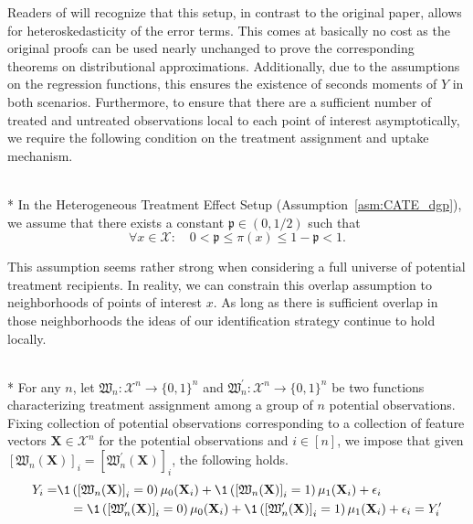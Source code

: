 Readers of \citet{demirkaya_optimal_2024} will recognize that this setup, in contrast to the original paper, allows for heteroskedasticity of the error terms.
This comes at basically no cost as the original proofs can be used nearly unchanged to prove the corresponding theorems on distributional approximations.
Additionally, due to the assumptions on the regression functions, this ensures the existence of seconds moments of $Y$ in both scenarios.
Furthermore, to ensure that there are a sufficient number of treated and untreated observations local to each point of interest asymptotically, we require the following condition on the treatment assignment and uptake mechanism.
\begin{boxD}
	\begin{asm}\label{asm:treatment_overlap}\mbox{}\\*
		In the Heterogeneous Treatment Effect Setup (Assumption~\ref{asm:CATE_dgp}), we assume that there exists a constant $\mathfrak{p} \in (0, 1/2)$ such that
		\begin{equation}
			\forall x \in \mathcal{X}: \quad 
			0 < \mathfrak{p} \leq \pi\left(x\right) \leq 1 - \mathfrak{p} < 1.
		\end{equation}
	\end{asm}
\end{boxD}
This assumption seems rather strong when considering a full universe of potential treatment recipients.
In reality, we can constrain this overlap assumption to neighborhoods of points of interest $x$.
As long as there is sufficient overlap in those neighborhoods the ideas of our identification strategy continue to hold locally.
\begin{boxD}
	\begin{asm}\label{asm:sutva}\mbox{}\\*
		For any $n$, let $\mathfrak{W}_{n}: \mathcal{X}^{n} \rightarrow \{0,1\}^{n}$ and $\mathfrak{W}_{n}^{\prime}: \mathcal{X}^{n} \rightarrow \{0,1\}^{n}$ be two functions characterizing treatment assignment among a group of $n$ potential observations.
		Fixing collection of potential observations corresponding to a collection of feature vectors $\mathbf{X} \in  \mathcal{X}^{n}$ for the potential observations and $i \in [n]$, we impose that given $\left[\mathfrak{W}_{n}(\mathbf{X})\right]_{i} = \left[\mathfrak{W}_{n}^{\prime}(\mathbf{X})\right]_{i}$, the following holds.
		\begin{equation}
			\begin{aligned}
				Y_{i} = & \1\left(\left[\mathfrak{W}_{n}(\mathbf{X})\right]_{i} = 0\right)\mu_{0}(\mathbf{X}_i)
				+ \1\left(\left[\mathfrak{W}_{n}(\mathbf{X})\right]_{i} = 1\right)\mu_{1}(\mathbf{X}_i)
				+ \epsilon_i \\
				&\quad  = 
				\1\left(\left[\mathfrak{W}_{n}^{\prime}(\mathbf{X})\right]_{i} = 0\right)\mu_{0}(\mathbf{X}_i)
				+\1\left(\left[\mathfrak{W}_{n}^{\prime}(\mathbf{X})\right]_{i} = 1\right)\mu_{1}(\mathbf{X}_i)
				+ \epsilon_i
				= Y_{i}^{\prime}
			\end{aligned}
		\end{equation}
	\end{asm}
\end{boxD}

